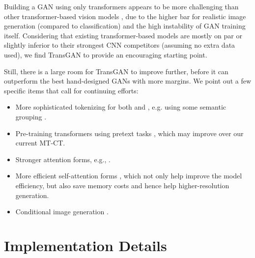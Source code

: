 \documentclass{article}
\begin{document}
Building a GAN using only transformers appears to be more challenging than other transformer-based vision models \cite{dosovitskiy2020image}, due to the higher bar for realistic image generation (compared to classification) and the high instability of GAN training itself. Considering that existing transformer-based models \cite{carion2020end,dosovitskiy2020image} are mostly on par or slightly inferior to their strongest CNN competitors (assuming no extra data used), we find TransGAN to provide an encouraging starting point. 

Still, there is a large room for TransGAN to improve further, before it can outperform the best hand-designed GANs with more margins. We point out a few specific items that call for continuing efforts:
\begin{itemize}
\vspace{-1em}
    \item More sophisticated tokenizing for both  and , e.g. using some semantic grouping \cite{wu2020visual}.\vspace{-0.3em}
    \item Pre-training transformers using pretext tasks \cite{dai2020up}, which may improve over our current MT-CT.\vspace{-0.3em}
    \item Stronger attention forms, e.g.,  \cite{zhu2020deformable}.\vspace{-0.3em}
    \item More efficient self-attention forms \cite{wang2020linformer,choromanski2020rethinking}, which not only help improve the model efficiency, but also save memory costs and hence help higher-resolution generation.\vspace{-0.5em}
    \item Conditional image generation \cite{lin2019coco}. 
\end{itemize}







\appendix
\section{Implementation Details}
\end{document}
